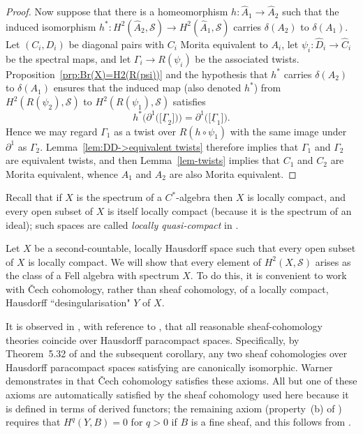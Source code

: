 \documentclass[12pt,a4paper]{amsart}
\newcommand{\Tgerms}{\mathcal{S}}
\begin{document}
\begin{proof}
Now suppose that there is a homeomorphism $h : \widehat{A}_1 \to
\widehat{A}_2$ such that the induced isomorphism $h^* :
H^2(\widehat{A}_2,\Tgerms) \to H^2(\widehat{A}_1,\Tgerms)$
carries $\delta(A_2)$ to $\delta(A_1)$. Let $(C_i, D_i)$ be
diagonal pairs with $C_i$ Morita equivalent to $A_i$, let
$\psi_i : \widehat{D}_i \to \widehat{C}_i$ be the spectral maps,
and let $\Gamma_i \to R(\psi_i)$ be the associated twists.
Proposition~\ref{prp:Br(X)=H2(R(psi))} and the hypothesis that
$h^*$ carries $\delta(A_2)$ to $\delta(A_1)$ ensures that the
induced map (also denoted $h^*$) from $H^2(R(\psi_2), \Tgerms)$
to $H^2(R(\psi_1),\Tgerms)$ satisfies
\[
h^*\big(\partial^1\big(\!\big[\underline{\Gamma}_2\big]\!\big)\big)
    = \partial^1\big(\!\big[\underline{\Gamma}_1\big]\!\big).
\]
Hence we may regard $\Gamma_1$ as a twist over $R(h \circ
\psi_1)$ with the same image under $\partial^1$ as $\Gamma_2$.
Lemma~\ref{lem:DD->equivalent twists} therefore implies that
$\Gamma_1$ and $\Gamma_2$ are equivalent twists, and then
Lemma~\ref{lem-twists} implies that $C_1$ and $C_2$ are Morita
equivalent, whence $A_1$ and $A_2$ are also Morita equivalent.
\end{proof}

Recall that if $X$ is the spectrum of a $C^*$-algebra then $X$
is locally compact, and every open subset of $X$ is itself
locally compact (because it is the spectrum of an ideal); such
spaces are called \emph{locally quasi-compact} in
\cite[\S3.3]{dix}.

\begin{remark}\label{rmk:cohomologies coincide}
Let $X$ be a second-countable, locally Hausdorff space such
that every open subset of $X$ is locally compact. We will show
that every element of $H^2(X,\Tgerms)$ arises as the class of a
Fell algebra with spectrum $X$. To do this, it is convenient to
work with \v{C}ech cohomology, rather than sheaf cohomology, of
a locally compact, Hausdorff ``desingularisation" $Y$ of $X$.

It is observed in \cite[Hooptedoodle~4.16]{tfb}, with reference
to \cite[\S5.23]{Warner1971}, that all reasonable
sheaf-cohomology theories coincide over Hausdorff paracompact
spaces. Specifically, by Theorem~5.32 of \cite{Warner1971} and
the subsequent corollary, any two sheaf cohomologies over
Hausdorff paracompact spaces satisfying
\cite[Axioms~5.18]{Warner1971} are canonically isomorphic.
Warner demonstrates in \cite[\S5.33]{Warner1971} that \v{C}ech
cohomology satisfies these axioms. All but one of these axioms
are automatically satisfied by the sheaf cohomology used here
because it is defined in terms of derived functors; the
remaining axiom (property~(b) of
\cite[Axioms~5.18]{Warner1971}) requires that $H^q(Y,B) = 0$
for $q > 0$ if $B$ is a fine sheaf, and this follows from
\cite[Proposition~4.36]{Voisin2002}.
\end{remark}
\end{document}
